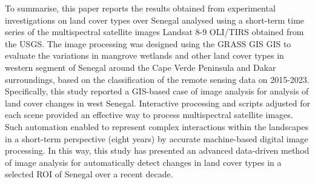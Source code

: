\documentclass[earth,article,submit,pdftex,moreauthors]{Definitions/mdpi}
\begin{document}
To summarise, this paper reports the results obtained from experimental investigations on land cover types over Senegal analysed using a short-term time series of the multispectral satellite images Landsat 8-9 OLI/TIRS obtained from the USGS. The image processing was designed using the GRASS GIS GIS to evaluate the variations in mangrove wetlands and other land cover types in western segment of Senegal around the Cape Verde Peninsula and Dakar surroundings, based on the classification of the remote sensing data on 2015-2023. Specifically, this study reported a GIS-based case of image analysis for analysis of land cover changes in west Senegal. Interactive processing and  scripts adjusted for each scene provided an effective way to process multispectral satellite images. Such automation enabled to represent complex interactions within the landscapes in a short-term perspective (eight years) by accurate machine-based digital image processing. In this way, this study has presented an advanced data-driven method of image analysis for automatically detect changes in land cover types in a selected ROI of Senegal over a recent decade.






\end{document}
